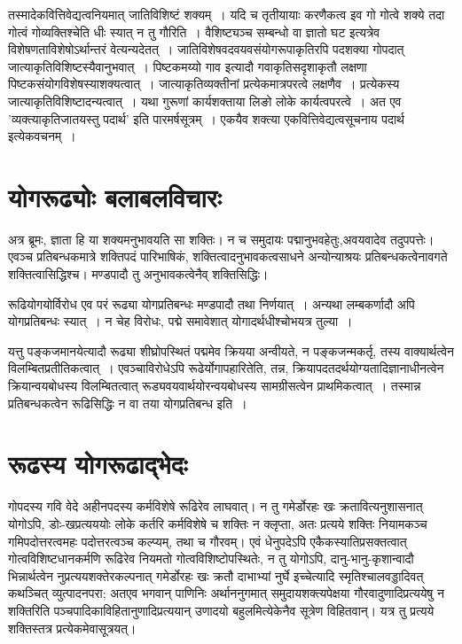 		\begin{small}

			तस्मादेकवित्तिवेद्यत्वनियमात् जातिविशिष्टं शक्यम्~। यदि च तृतीयायाः करणैकत्व इव गो गोत्वे शक्ये तदा गोत्वं गोव्यक्तिश्चेति धीः स्यात् न तु गौरिति~। वैशिष्ट्यञ्च सम्बन्धो वा ज्ञातो घट इत्यत्रेव विशेषणताविशेषोऽर्थान्तरं वेत्यन्यदेतत्~। जातिविशेषवदवयवसंयोगरूपाकृतिरपि पदशक्या गोपदात् जात्याकृतिविशिष्टस्यैवानुभवात्~। पिष्टकमय्यो गाव इत्यादौ गवाकृतिसदृशाकृतौ लक्षणा पिष्टकसंयोगविशेषस्याशक्यत्वात्~। जात्याकृतिव्यक्तीनां प्रत्येकमात्रपरत्वे लक्षणैव~। प्रत्येकस्य जात्याकृतिविशिष्टादन्यत्वात्~। यथा गुरूणां कार्यशक्ताया लिङो लोके कार्यत्वपरत्वे~। अत एव ’व्यक्त्याकृतिजातयस्तु पदार्थ’ इति पारमर्षसूत्रम्~। एकयैव शक्त्या एकवित्तिवेद्यत्वसूचनाय पदार्थ इत्येकवचनम्~। 
		\end{small}

	\section{योगरूढ्योः बलाबलविचारः}
	
		अत्र ब्रूमः, ज्ञाता हि या शक्यमनुभावयति सा शक्तिः। न च समुदायः पद्मानुभवहेतुः,अवयवादेव तदुपपत्तेः। एवञ्च प्रतिबन्धकमात्रे शक्तिपदं पारिभाषिकं, शक्तित्वादनुभावकत्वसाधने अन्योन्याश्रयः प्रतिबन्धकत्वेनावगते शक्तित्वासिद्धिश्च। मण्डपादौ तु अनुभावकत्वेनैव् शक्तिसिद्धिः। 
		
		रूढियोगयोर्विरोध एव परं रूढ्या योगप्रतिबन्धः मण्डपादौ तथा निर्णयात्~। अन्यथा लम्बकर्णादौ  अपि योगप्रतिबन्धः स्यात्~। न चेह विरोधः, पद्मे समावेशात् योगादर्थधीश्चोभयत्र तुल्या~। 
		
		यत्तु पङ्कजमानयेत्यादौ रूढ्या शीघ्रोपस्थितं पद्ममेव  क्रियया अन्वीयते, न पङ्कजन्मकर्तृ, तस्य वाक्यार्थत्वेन  विलम्बितप्रतीतिकत्वात्~। एवञ्चाविरोधेऽपि रूढेर्योगापहारितेति, तन्न, क्रियापदतदर्थयोग्यतादिज्ञानाधीनत्वेन क्रियान्वयबोधस्य विलम्बितत्वात् रूड्यवयवार्थयोरन्वयबोधस्य सामग्रीसत्वेन प्राथमिकत्वात्~। तस्मान्न प्रतिबन्धकत्वेन  रूढिसिद्धिः न वा तया योगप्रतिबन्ध इति~।   

	\section{रूढस्य योगरूढाद्भेदः}
	
		गोपदस्य गवि वेदे अहीनपदस्य कर्मविशेषे रूढिरेव लाघवात्।  न तु गमेर्डोरहः खः क्रतावित्यनुशासनात् योगोऽपि, डोः-खप्रत्यययोः लोके कर्तरि कर्मविशेषे च शक्तिः न क्लृप्ता, अतः प्रत्यये शक्तिः नियामकञ्च  गमिपदोत्तरत्वमहः पदोत्तरत्वञ्च  कल्प्यम्, तथा च गौरवम्।  एवं धेनुपदेऽपि एकैकस्यातिप्रसक्तत्वात् गोत्वविशिष्टधानकर्मणि रूढिरेव नियमतो  गोत्वविशिष्टोपस्थितेः, न तु योगोऽपि, दानु-भानु-कृशान्वादौ भिन्नार्थत्वेन नुप्रत्ययशक्तेरकल्पनात् गमेर्डोरहः खः क्रतौ दाभाभ्यां नुर्घे इच्चेत्यादि स्मृतिश्चालवड्डादिवत् कथञ्चित् व्युत्पादनपरा; अतएव भगवान् पाणिनिः अर्थाननुगमात् समुदायशक्त्यपेक्षया गौरवादुणादिप्रत्ययेषु न शक्तिरिति  पञ्चपादिकाविहितानुणादिप्रत्ययान् उणादयो बहुलमित्येकेनैव सूत्रेण विहितवान्। यत्र तु प्रत्यये शक्तिस्तत्र प्रत्येकमेवासूत्रयत्।

